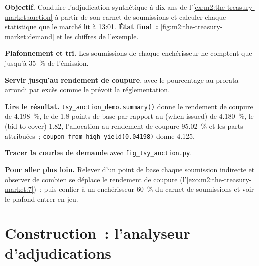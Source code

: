\begin{tutorial}
\textbf{Objectif.} Conduire l'adjudication synthétique à dix ans de
l'\cref{ex:m2:the-treasury-market:auction} à partir de son carnet de soumissions et calculer chaque
statistique que le marché lit à 13:01. \textbf{État final~:}
\cref{fig:m2:the-treasury-market:demand} et les chiffres de l'exemple.
\begin{tutsteps}
\item \textbf{Plafonnement et tri.} Les soumissions de chaque enchérisseur ne comptent que jusqu'à 35~\% de l'émission.
\label{lst:m2:the-treasury-market:cap}
\item \textbf{Servir jusqu'au rendement de coupure}, avec le pourcentage au prorata arrondi par excès
comme le prévoit la réglementation.
\label{lst:m2:the-treasury-market:run}
\item \textbf{Lire le résultat.} \texttt{tsy\_auction\_demo.summary()} donne le
rendement de coupure de 4.198~\%, le  de 1.8 points de base par rapport au  (when-issued) de 4.180~\%,
le  (bid-to-cover) 1.82, l'allocation au rendement de coupure 95.02~\% et les parts
attribuées~; \texttt{coupon\_from\_high\_yield(0.04198)} donne 4.125.
\item \textbf{Tracer la courbe de demande} avec \texttt{fig\_tsy\_auction.py}.
\end{tutsteps}
\textbf{Pour aller plus loin.} Relever d'un point de base chaque soumission indirecte
et observer de combien se déplace le rendement de coupure (l'\cref{exo:m2:the-treasury-market:7})~; puis
confier à un enchérisseur 60~\% du carnet de soumissions et voir le plafond entrer en jeu.
\end{tutorial}

\section{Construction~: l'analyseur d'adjudications}\label{bld:m2:the-treasury-market:auction}

